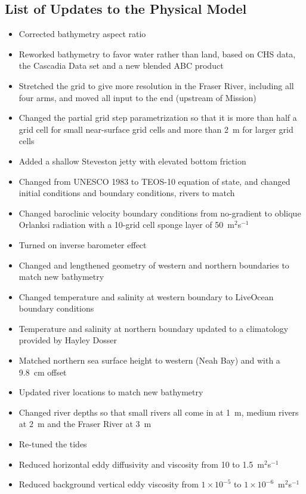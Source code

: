 \documentclass[draft,jgrga]{agutexSI2019}
\begin{document}
\begin{article}
\section{List of Updates to the Physical Model} %
\label{sec:physUp}
\begin{itemize}
\item Corrected bathymetry aspect ratio
\item Reworked bathymetry to favor water rather than land, based on CHS
data, the Cascadia Data set and a new blended ABC product
\item Stretched the grid to give more resolution in the Fraser River, including all
four arms, and moved all input to the end (upstream of Mission)
\item Changed the partial grid step parametrization so that it is more than half a
grid cell for small near-surface grid cells and more than 2~m for larger grid cells
\item Added a shallow Steveston jetty with elevated bottom friction
\item Changed from UNESCO 1983 to TEOS-10 equation of state, and changed initial conditions and
boundary conditions, rivers to match
\item Changed baroclinic velocity boundary conditions from no-gradient to oblique Orlanksi radiation with a 10-grid cell
sponge layer of 50~m$^2$s$^{-1}$
\item Turned on inverse barometer effect
\item Changed and lengthened geometry of western and northern boundaries to match new bathymetry
\item Changed temperature and salinity at western boundary to LiveOcean boundary conditions
\item Temperature and salinity at northern boundary updated to a climatology provided by Hayley Dosser
\item Matched northern sea surface height to western (Neah Bay) and with a 9.8~cm offset
\item Updated river locations to match new bathymetry
\item Changed river depths so that small rivers all come in at 1~m, medium rivers at 2~m and the Fraser River at 3~m
\item Re-tuned the tides
\item Reduced horizontal eddy diffusivity and viscosity from 10 to 1.5~m$^2$s$^{-1}$
\item Reduced background vertical eddy viscosity from $1\times10^{-5}$ to $1\times10^{-6}$~m$^2$s$^{-1}$

\end{itemize}
\end{article}
\end{document}
